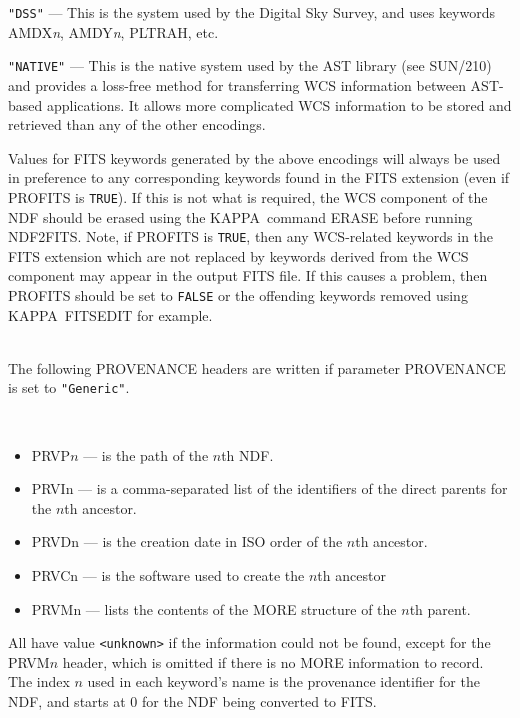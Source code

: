 \documentclass[twoside,11pt]{article}
\newcommand{\latex}[1]{#1}
\newcommand{\xref}[3]{#1}
\newcommand{\KAPPA}{{\footnotesize KAPPA}}
\newcommand{\sstdiytopic}[2]{\goodbreak \item[{\hspace{-0.35em}#1\hspace{-0.35em}:}] \mbox{} \\[1.3ex] #2}
\newcommand{\ssthitemlist}[1]{
  \latex{
  \mbox{} \\
  \vspace{-3.5ex}
  }
  \begin{itemize}
     #1
  \end{itemize}
}
\newcommand{\sstitem}{\item}
\newcommand{\sstdiytopic}[2]{\\ \item[{#1}:]
      \begin{description}
         #2
      \end{description}
   }
\newcommand{\sstitem}{\item}
\begin{document}
{{{         \sstitem
         \texttt{"DSS"} --- This is the system used by the Digital Sky Survey, and
         uses keywords AMDX\textit{n}, AMDY\textit{n}, PLTRAH, etc.

         \sstitem
         \texttt{"NATIVE"} --- This is the native system used by the AST library (see
         SUN/210) and provides a loss-free method for transferring WCS
         information between AST-based applications.  It allows more
         complicated WCS information to be stored and retrieved than any of 
         the other encodings.
      }

      Values for FITS keywords generated by the above encodings will
      always be used in preference to any corresponding keywords found in
      the FITS extension (even if PROFITS is \texttt{TRUE}).
      If this is not what
      is required, the WCS component of the NDF should be erased using
      the \KAPPA\ command \xref{ERASE}{sun95}{ERASE} before running NDF2FITS. Note, if PROFITS
      is \texttt{TRUE}, then any WCS-related keywords in the FITS extension
      which are not replaced by keywords derived from the WCS component may
      appear in the output FITS file. If this causes a problem, then
      PROFITS should be set to \texttt{FALSE} or the offending keywords removed
      using \KAPPA\ 
      \xref{FITSEDIT}{sun95}{FITSEDIT}
      for example.
   }
   \sstdiytopic{
      \label{ndf2fits_provenance}Provenance
   }{
      The following PROVENANCE headers are written if parameter
      PROVENANCE is set to \texttt{"Generic"}.
      \ssthitemlist{

         \sstitem
         PRVP$n$ --- is the path of the $n$th NDF.

         \sstitem
         PRVIn --- is a comma-separated list of the identifiers of the 
           direct parents for the $n$th ancestor.

         \sstitem
         PRVDn --- is the creation date in ISO order of the $n$th ancestor.

         \sstitem
         PRVCn --- is the software used to create the $n$th ancestor
         
         \sstitem
         PRVMn --- lists the contents of the MORE structure of the $n$th
           parent.
      }
      All have value \texttt{<unknown>} if the information could not be found, 
      except for the PRVM$n$ header, which is omitted if there is no MORE 
      information to record.   The index $n$ used in each keyword's name 
      is the provenance identifier for the NDF, and starts at 0 for the
      NDF being converted to FITS.

}}
\end{document}

